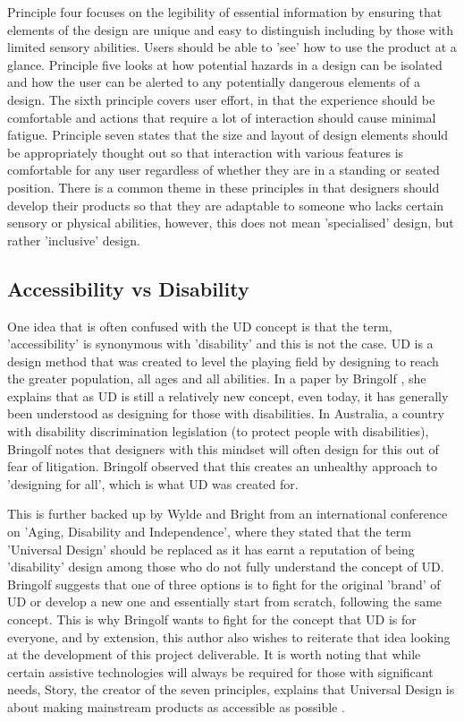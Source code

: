 Principle four focuses on the legibility of essential information by ensuring that elements of the design are unique and easy to distinguish including by those with limited sensory abilities.
Users should be able to 'see' how to use the product at a glance.
Principle five looks at how potential hazards in a design can be isolated and how the user can be alerted to any potentially dangerous elements of a design.
The sixth principle covers user effort, in that the experience should be comfortable and actions that require a lot of interaction should cause minimal fatigue.
Principle seven states that the size and layout of design elements should be appropriately thought out so that interaction with various features is comfortable for any user regardless of whether they are in a standing or seated position.
There is a common theme in these principles in that designers should develop their products so that they are adaptable to someone who lacks certain sensory or physical abilities, however, this does not mean 'specialised' design, but rather 'inclusive' design.

\subsection{Accessibility vs Disability}

One idea that is often confused with the UD concept is that the term, 'accessibility' is synonymous with 'disability' and this is not the case.
UD is a design method that was created to level the playing field by designing to reach the greater population, all ages and all abilities.
In a paper by Bringolf \cite{accessible}, she explains that as UD is still a relatively new concept, even today, it has generally been understood as designing for those with disabilities.
In Australia, a country with disability discrimination legislation (to protect people with disabilities), Bringolf notes that designers with this mindset will often design for this out of fear of litigation.
Bringolf observed that this creates an unhealthy approach to 'designing for all', which is what UD was created for. %

This is further backed up by Wylde \cite{accessiblebackup1} and Bright \cite{accessiblebackup2} from an international conference on 'Aging, Disability and Independence', where they stated that the term 'Universal Design' should be replaced as it has earnt a reputation of being 'disability' design among those who do not fully understand the concept of UD.
Bringolf suggests that one of three options is to fight for the original 'brand' of UD or develop a new one and essentially start from scratch, following the same concept.
This is why Bringolf wants to fight for the concept that UD is for everyone, and by extension, this author also wishes to reiterate that idea looking at the development of this project deliverable. %
It is worth noting that while certain assistive technologies will always be required for those with significant needs, Story, the creator of the seven principles, explains that Universal Design is about making mainstream products as accessible as possible \cite{sevenprinciples}.

